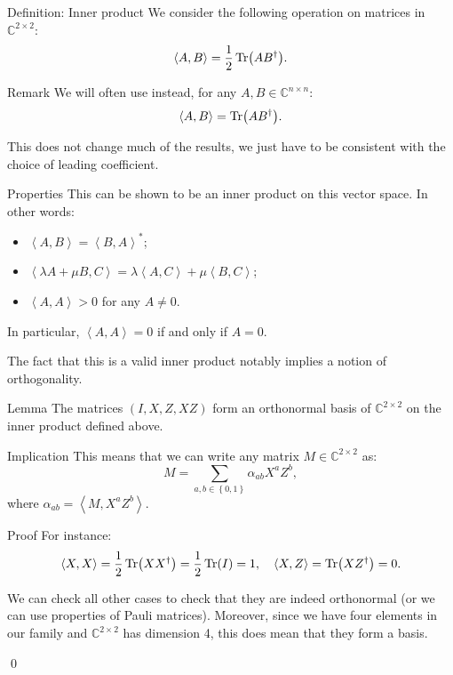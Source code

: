 \documentclass[a4paper]{article}
\begin{document}
\begin{parag}{Definition: Inner product}
    We consider the following operation on matrices in $\mathbb{C}^{2 \times 2}$: 
    \[\left\langle A, B \right\rangle = \frac{1}{2} \Tr\left(A B^{\dagger}\right).\]

    \begin{subparag}{Remark}
        We will often use instead, for any $A, B \in \mathbb{C}^{n \times n}$:
        \[\left\langle A, B \right\rangle = \Tr\left(A B^{\dagger}\right).\]

        This does not change much of the results, we just have to be consistent with the choice of leading coefficient.
    \end{subparag}

    \begin{subparag}{Properties}
        This can be shown to be an inner product on this vector space. In other words:
        \begin{itemize}
            \item $\left\langle A, B \right\rangle = \left\langle B, A \right\rangle^*$;
            \item $\left\langle \lambda A + \mu B, C \right\rangle = \lambda \left\langle A, C \right\rangle + \mu \left\langle B, C \right\rangle$;
            \item $\left\langle A, A \right\rangle > 0$ for any $A \neq 0$.
        \end{itemize}

        In particular, $\left\langle A, A \right\rangle = 0$ if and only if $A = 0$.

        The fact that this is a valid inner product notably implies a notion of orthogonality.
    \end{subparag}
\end{parag}

\begin{parag}{Lemma}
    The matrices $\left(I, X, Z, X Z\right)$ form an orthonormal basis of $\mathbb{C}^{2 \times 2}$ on the inner product defined above. 

    \begin{subparag}{Implication}
        This means that we can write any matrix $M \in \mathbb{C}^{2 \times 2}$ as: 
        \[M = \sum_{a, b \in \left\{0, 1\right\}} \alpha_{ab} X^a Z^b,\]
        where $\alpha_{ab} = \left\langle M, X^a Z^b \right\rangle$.
    \end{subparag}

    \begin{subparag}{Proof}
        For instance: 
        \[\left\langle X, X \right\rangle = \frac{1}{2} \Tr\left(X X^{\dagger}\right) = \frac{1}{2} \Tr\left(I\right) = 1, \mathspace \left\langle X, Z \right\rangle = \Tr\left(X Z^{\dagger}\right) = 0.\]

        We can check all other cases to check that they are indeed orthonormal (or we can use properties of Pauli matrices). Moreover, since we have four elements in our family and $\mathbb{C}^{2 \times 2}$ has dimension 4, this does mean that they form a basis.

        \qed
    \end{subparag}
\end{parag}
\end{document}
